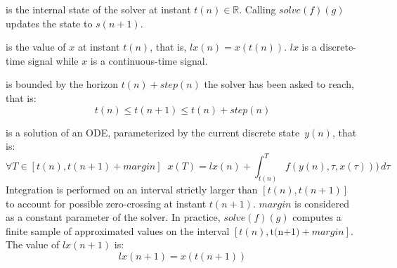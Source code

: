 \documentclass[11pt,titlepage,twoside]{report}
\newcommand{\lx}{\ensuremath{\mathit{lx}}}
\newcommand{\Solve}[2]{\mathit{solve}({#1})({#2})}
\newcommand{\bR}{\mathbb{R}}
\begin{document}
  \begin{description}[leftmargin=3.5em,style=multiline]
    \item[$s(n)$]
      is the internal state of the solver at instant $t(n) \in \bR$. Calling
      $\Solve{f}{g}$ updates the state to $s(n+1)$.
    \item[$\lx(n)$]
      is the value of $x$ at instant $t(n)$,
      that is, $\lx(n) = x(t(n))$. $\lx$ is a discrete-time signal while
      $x$ is a continuous-time signal.
    \item[$t(n+1)$] is bounded by the horizon $t(n) + step(n)$ the solver has been
      asked to reach, that is:
      \[t(n) \leq t(n+1) \leq t(n) + step(n)\]
    \item[$x$]
      is a solution of an ODE,
      parameterized by the current discrete state~$y(n)$, that is:
      \[\forall T \in [t(n), t(n+1) + margin]\;\;
            x(T) = \lx(n) + \int_{t(n)}^{T} f (y(n), \tau, x(\tau)))
            \,d\tau
      \] 
      Integration is performed on an interval strictly
            larger than \mbox{$[t(n),t(n+1)]$} to account for
            possible zero-crossing at instant $t(n+1)$. $margin$ is
            considered as a constant parameter of the
            solver. %
            In practice, $\Solve{f}{g}$ computes a finite sample
            of approximated values on the interval $[t(n), \mbox{t(n+1)} + margin]$.
            The value of $\lx(n+1)$ is: \[ \lx(n+1) = x(t(n+1)) \]


\end{description}
\end{document}
